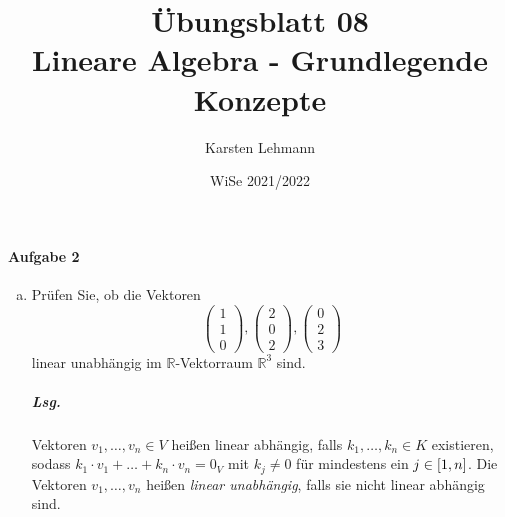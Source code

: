 \documentclass{scrreprt}
\author{Karsten Lehmann}
\date{WiSe 2021/2022}
\title{Übungsblatt 08\\Lineare Algebra - Grundlegende Konzepte}
\begin{document}
\paragraph{Aufgabe 2}
\begin{enumerate}[(a)]
\item Prüfen Sie, ob die Vektoren
  \[
    \begin{pmatrix}1 \\ 1 \\ 0\end{pmatrix},
    \begin{pmatrix}2 \\ 0 \\ 2\end{pmatrix},
    \begin{pmatrix}0 \\ 2 \\ 3\end{pmatrix}
  \]
  linear unabhängig im $\mathbb{R}$-Vektorraum
  $\mathbb{R}^3$ sind.

  \subparagraph{Lsg.} Vektoren $v_1, \ldots, v_n \in V$ heißen linear abhängig,
  falls $k_1, \ldots, k_n \in K$ existieren, sodass
  $k_1 \cdot v_1 + \ldots + k_n \cdot v_n = 0_V$ mit $k_j \ne 0$ für mindestens
  ein $j \in \qty[1, n]$.
  Die Vektoren $v_1, \ldots, v_n$ heißen \emph{linear unabhängig}, falls sie
  nicht linear abhängig sind.


\end{enumerate}
\end{document}
